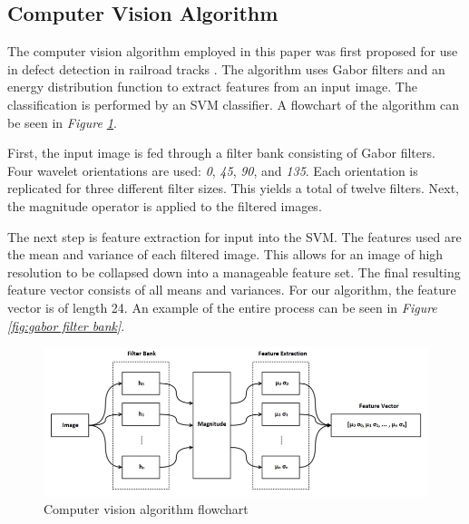 \documentclass[letterpaper, 10 pt, conference]{ieeeconf}  %
\begin{document}
\subsection{Computer Vision Algorithm}

The computer vision algorithm employed in this paper was first proposed for use in defect detection in railroad tracks \cite{railDefect}. The algorithm uses Gabor filters and an energy distribution function to extract features from an input image. The classification is performed by an SVM classifier. A flowchart of the algorithm can be seen in \textit{Figure \ref{fig:vision algorithm diagram}}.

First, the input image is fed through a filter bank consisting of Gabor filters. Four wavelet orientations are used: \textit{0\degree}, \textit{45\degree}, \textit{90\degree}, and \textit{135\degree}. Each orientation is replicated for three different filter sizes. This yields a total of twelve filters. Next, the magnitude operator is applied to the filtered images. 

The next step is feature extraction for input into the SVM. The features used are the mean and variance of each filtered image. This allows for an image of high resolution to be collapsed down into a manageable feature set. The final resulting feature vector consists of all means and variances. For our algorithm, the feature vector is of length 24. An example of the entire process can be seen in \textit{Figure \ref{fig:gabor filter bank}}.

\begin{figure}
    \centering
    \includegraphics[width=.75\textwidth]{computer_vision_diagram.png}
    \caption{Computer vision algorithm flowchart}
    \vspace*{2mm}
    \label{fig:vision algorithm diagram}
\end{figure}
\end{document}
